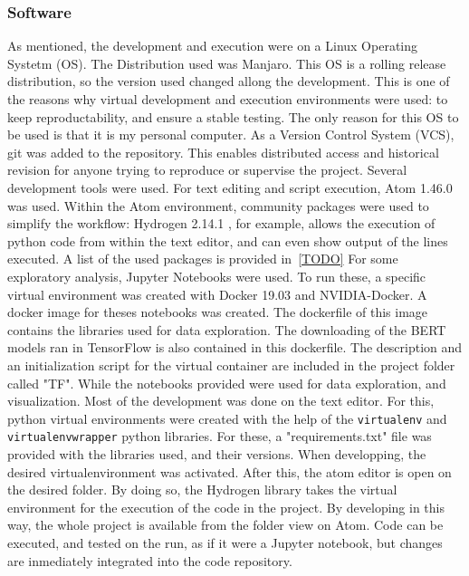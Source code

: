 \subsubsection{Software}\label{subs:Software}
As mentioned, the development and execution were on a Linux Operating Systetm (OS). The Distribution used was Manjaro. This OS is a rolling release distribution, so the version used changed allong the development. This is one of the reasons why virtual development and execution environments were used: to keep reproductability, and ensure a stable testing. The only reason for this OS to be used is that it is my personal computer.
As a Version Control System (VCS), git was added to the repository. This enables distributed access and historical revision for anyone trying to reproduce or supervise the project.
Several development tools were used. For text editing and script execution, Atom 1.46.0 \cite{TODO} was used. Within the Atom environment, community packages were used to simplify the workflow: Hydrogen 2.14.1 \cite{TODO}, for example, allows the execution of python code from within the text editor, and can even show output of the lines executed. A list of the used packages is provided in~\ref{TODO}
For some exploratory analysis, Jupyter Notebooks \cite{TODO} were used. To run these, a specific virtual environment was created with Docker 19.03 \cite{TODO} and NVIDIA-Docker. A docker image for theses notebooks was created. The dockerfile of this image contains the libraries used for data exploration. The downloading of the BERT models ran in TensorFlow is also contained in this dockerfile. The description and an initialization script for the virtual container are included in the project folder called "TF".
While the notebooks provided were used for data exploration, and visualization. Most of the development was done on the text editor. For this, python virtual environments were created with the help of the \lstinline{virtualenv} and \lstinline{virtualenvwrapper} python libraries. For these, a "requirements.txt" file was provided with the libraries used, and their versions.
When developping, the desired virtualenvironment was activated. After this, the atom editor is open on the desired folder. By doing so, the Hydrogen library takes the virtual environment for the execution of the code in the project.
By developing in this way, the whole project is available from the folder view on Atom. Code can be executed, and tested on the run, as if it were a Jupyter notebook, but changes are inmediately integrated into the code repository.
